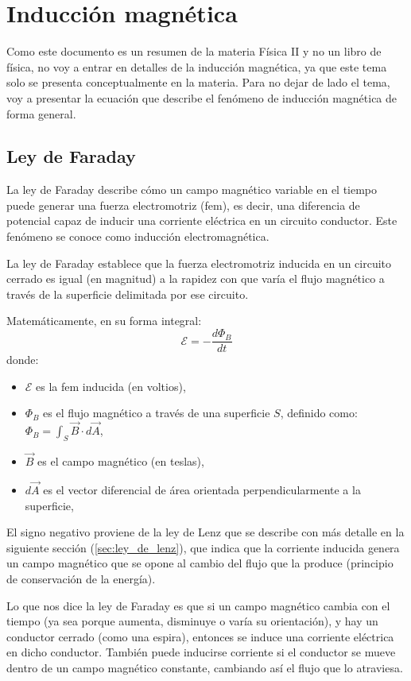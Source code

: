 \section{Inducción magnética}

Como este documento es un resumen de la materia Física II y no un libro de física, no voy a entrar en detalles de la inducción magnética, ya que este tema solo se presenta conceptualmente en la materia. Para no dejar de lado el tema, voy a presentar la ecuación que describe el fenómeno de inducción magnética de forma general.

\subsection{Ley de Faraday}

La ley de Faraday describe cómo un campo magnético variable en el tiempo puede generar una fuerza electromotriz (fem), es decir, una diferencia de potencial capaz de inducir una corriente eléctrica en un circuito conductor. Este fenómeno se conoce como inducción electromagnética.

La ley de Faraday establece que la fuerza electromotriz inducida en un circuito cerrado es igual (en magnitud) a la rapidez con que varía el flujo magnético a través de la superficie delimitada por ese circuito.

Matemáticamente, en su forma integral:
\[
  \mathcal{E} = -\frac{d\Phi_B}{dt}
\]
donde:
\begin{itemize}
  \item \(\mathcal{E}\) es la fem inducida (en voltios),
  \item \(\Phi_B\) es el flujo magnético a través de una superficie $S$, definido como: \(\Phi_B = \int_S \vec{B} \cdot d\vec{A}\),
  \item \(\vec{B}\) es el campo magnético (en teslas),
  \item \(d\vec{A}\) es el vector diferencial de área orientada perpendicularmente a la superficie,
\end{itemize}

El signo negativo proviene de la ley de Lenz que se describe con más detalle en la siguiente sección (\ref{sec:ley_de_lenz}), que indica que la corriente inducida genera un campo magnético que se opone al cambio del flujo que la produce (principio de conservación de la energía).

Lo que nos dice la ley de Faraday es que si un campo magnético cambia con el tiempo (ya sea porque aumenta, disminuye o varía su orientación), y hay un conductor cerrado (como una espira), entonces se induce una corriente eléctrica en dicho conductor.
También puede inducirse corriente si el conductor se mueve dentro de un campo magnético constante, cambiando así el flujo que lo atraviesa.

